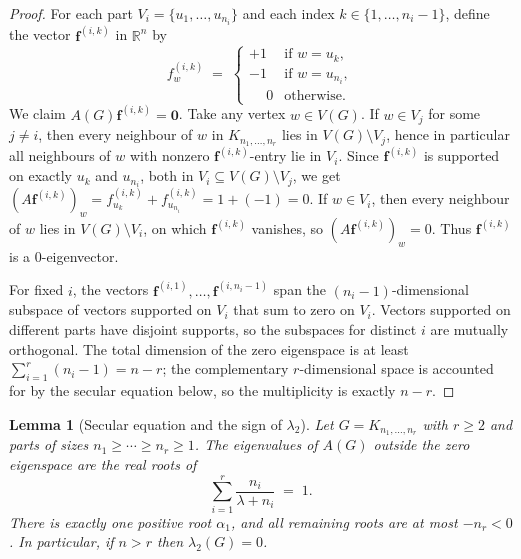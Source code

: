 \documentclass[preprint,12pt]{elsarticle}
\theoremstyle{plain}
\newtheorem{lemma}[theorem]{Lemma}
\theoremstyle{definition}
\newcommand{\R}{\mathbb{R}}
\begin{document}
\begin{proof}
For each part $V_i = \{u_1,\ldots,u_{n_i}\}$ and each index
$k \in \{1,\ldots,n_i - 1\}$, define the vector $\mathbf{f}^{(i,k)}$
in $\R^n$ by
\[
  f^{(i,k)}_w
  \;=\;
  \begin{cases}
    +1 & \text{if } w = u_k, \\
    -1 & \text{if } w = u_{n_i}, \\
    \phantom{+}0 & \text{otherwise.}
  \end{cases}
\]
We claim $A(G)\mathbf{f}^{(i,k)} = \mathbf{0}$.
Take any vertex $w \in V(G)$.
If $w \in V_j$ for some $j \neq i$, then every neighbour of $w$ in
$K_{n_1,\ldots,n_r}$ lies in $V(G) \setminus V_j$, hence in particular
all neighbours of $w$ with nonzero $\mathbf{f}^{(i,k)}$-entry lie in
$V_i$.  Since $\mathbf{f}^{(i,k)}$ is supported on exactly $u_k$ and
$u_{n_i}$, both in $V_i \subseteq V(G) \setminus V_j$, we get
$(A\mathbf{f}^{(i,k)})_w = f^{(i,k)}_{u_k} + f^{(i,k)}_{u_{n_i}} = 1 + (-1) = 0$.
If $w \in V_i$, then every neighbour of $w$ lies in $V(G) \setminus V_i$,
on which $\mathbf{f}^{(i,k)}$ vanishes, so $(A\mathbf{f}^{(i,k)})_w = 0$.
Thus $\mathbf{f}^{(i,k)}$ is a $0$-eigenvector.

For fixed $i$, the vectors $\mathbf{f}^{(i,1)},\ldots,\mathbf{f}^{(i,n_i-1)}$
span the $(n_i-1)$-dimensional subspace of vectors supported on $V_i$
that sum to zero on $V_i$.
Vectors supported on different parts have disjoint supports, so the
subspaces for distinct $i$ are mutually orthogonal.
The total dimension of the zero eigenspace is at least
$\sum_{i=1}^r (n_i-1) = n - r$; the complementary $r$-dimensional
space is accounted for by the secular equation below, so the
multiplicity is exactly $n - r$.
\end{proof}

\begin{lemma}[Secular equation and the sign of $\lambda_2$]
  \label{lem:secular}
  Let $G = K_{n_1,\ldots,n_r}$ with $r \geq 2$ and parts of sizes
  $n_1 \geq \cdots \geq n_r \geq 1$.
  The eigenvalues of $A(G)$ outside the zero eigenspace are the
  real roots of
  \begin{equation}
    \label{eq:secular}
    \sum_{i=1}^r \frac{n_i}{\lambda + n_i} \;=\; 1.
  \end{equation}
  There is exactly one positive root $\alpha_1$, and all remaining
  roots are at most $-n_r < 0$.  In particular, if $n > r$ then
  $\lambda_2(G) = 0$.
\end{lemma}
\end{document}
